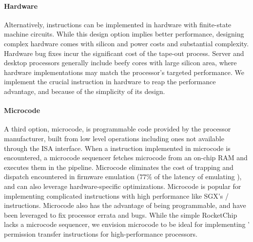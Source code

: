 \paragraph{Hardware}
Alternatively, instructions can be implemented in hardware with 
finite-state machine circuits.
While this design option implies better performance,
designing complex hardware comes with silicon and power costs and
substantial complexity.
Hardware bug fixes incur the significant cost of the tape-out process.
Server and desktop processors generally include beefy cores with
large silicon area, where hardware implementations may match the
processor's targeted performance.
We implement the crucial \sdswitch instruction in hardware
to reap the performance advantage,
and because of the simplicity of its design.

\paragraph{Microcode}
A third option, microcode, is programmable code provided by the 
processor manufacturer, built from low level operations including ones 
not available through the ISA interface.
When a instruction implemented in microcode is encountered, a microcode
sequencer fetches microcode from an on-chip RAM and executes them in the
pipeline.
Microcode eliminates the cost of trapping and dispatch encountered in 
firmware emulation ($77\%$ of the latency of emulating \scprot),
and can also leverage hardware-specific optimizations.
Microcode is popular for implementing complicated instructions
with high performance like SGX's / instructions.
Microcode also has the advantage of being programmable, and have been
leveraged to fix processor errata and bugs.
While the simple RocketChip lacks a microcode sequencer, 
we envision microcode to be ideal for implementing \seccells'
permission transfer instructions for high-performance processors.